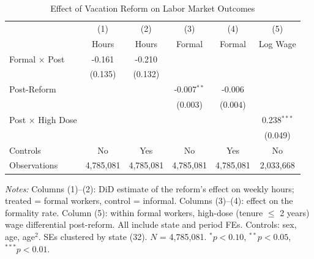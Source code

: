 \begin{table}[t]
\centering
\caption{Effect of Vacation Reform on Labor Market Outcomes}
\label{tab:main}
\small
\begin{tabular}{lccccc}
  \toprule
  & (1) & (2) & (3) & (4) & (5) \\
  & Hours & Hours & Formal & Formal & Log Wage \\
  \midrule
  Formal $\times$ Post & -0.161 & -0.210 & & & \\
  & (0.135) & (0.132) & & & \\
  Post-Reform & & & -0.007$^{**}$ & -0.006 & \\
  & & & (0.003) & (0.004) & \\
  Post $\times$ High Dose & & & & & 0.238$^{***}$ \\
  & & & & & (0.049) \\
  \midrule
  Controls & No & Yes & No & Yes & No \\
  Observations & 4,785,081 & 4,785,081 & 4,785,081 & 4,785,081 & 2,033,668 \\
  \bottomrule
\end{tabular}
\begin{tablenotes}
\small
\item \textit{Notes:} Columns (1)--(2): DiD estimate of the reform's effect on weekly hours; treated = formal workers, control = informal. Columns (3)--(4): effect on the formality rate. Column (5): within formal workers, high-dose (tenure $\leq$ 2 years) wage differential post-reform. All include state and period FEs. Controls: sex, age, age$^2$. SEs clustered by state (32). $N$ = 4,785,081. $^{*}p<0.10$, $^{**}p<0.05$, $^{***}p<0.01$.
\end{tablenotes}
\end{table}
